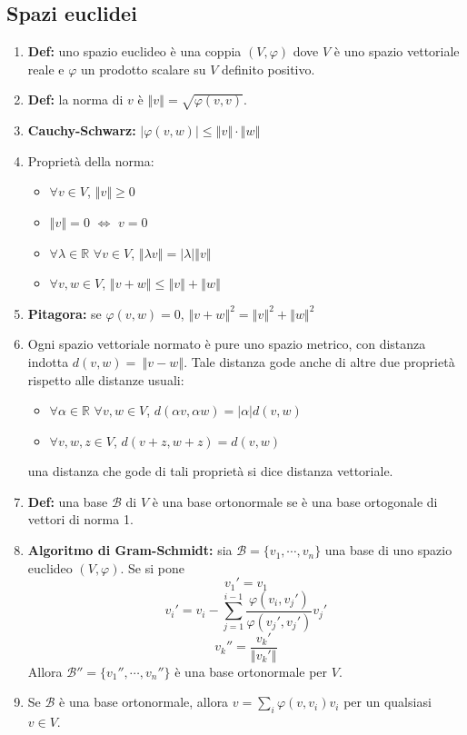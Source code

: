 \documentclass[a4paper,11pt]{article}
\newcommand{\norm}[1]{\left\Vert#1\right\Vert}		%
\begin{document}
\subsection{Spazi euclidei}
\begin{enumerate}[resume]
	\item\textbf{Def:} uno spazio euclideo è una coppia $(V,\varphi)$ dove $V$ è uno spazio vettoriale reale e $\varphi$ un prodotto scalare su $V$ definito positivo.
	\item\textbf{Def:} la norma di $v$ è $\norm{v}=\sqrt{\varphi(v,v)}$.
	\item\textbf{Cauchy-Schwarz:} $|\varphi(v,w)|\leq\norm{v}\cdot\norm{w}$
	\item Proprietà della norma:
	\begin{itemize}
		\item $\forall v\in V$, $\norm{v}\geq 0$
		\item $\norm{v}=0$ $\Leftrightarrow$ $v=0$
		\item $\forall \lambda\in\mathbb{R}$ $\forall v\in V$, $\norm{\lambda v}=\left|\lambda\right|\norm{v}$
		\item $\forall v,w\in V$, $\norm{v+w}\leq\norm{v}+\norm{w}$
	\end{itemize}
	\item\textbf{Pitagora:} se $\varphi(v,w)=0$, $\norm{v+w}^2=\norm{v}^2+\norm{w}^2$
	\item Ogni spazio vettoriale normato è pure uno spazio metrico, con distanza indotta $d(v,w)=~\norm{v-w}$. Tale distanza gode anche di altre due proprietà rispetto alle distanze usuali:
	\begin{itemize}
		\item $\forall \alpha\in\mathbb{R}$ $\forall v,w\in V$, $d(\alpha v,\alpha w)=\left|\alpha\right|d(v,w)$
		\item $\forall v,w,z\in V$, $d(v+z,w+z)=d(v,w)$
	\end{itemize}
	una distanza che gode di tali proprietà si dice distanza vettoriale.
	\item\textbf{Def:} una base $\mathcal{B}$ di $V$ è una base ortonormale se è una base ortogonale di vettori di norma 1.
	\item\textbf{Algoritmo di Gram-Schmidt:} sia $\mathcal{B}=\{v_1,\cdots,v_n\}$ una base di uno spazio euclideo $(V,\varphi)$. Se si pone
	\[v_1'=v_1\]
	\[v_i'=v_i-\sum_{j=1}^{i-1}\frac{\varphi(v_i,v_j')}{\varphi(v_j',v_j')}v_j'\]
	\[v_k''=\frac{v_k'}{\norm{v_k'}}\]
	Allora $\mathcal{B}''=\{v_1'',\cdots,v_n''\}$ è una base ortonormale per $V$.
	\item Se $\mathcal{B}$ è una base ortonormale, allora $v=\sum_{i}\varphi(v,v_i)v_i$ per un qualsiasi $v\in V$.

\end{enumerate}
\end{document}
